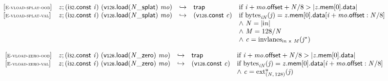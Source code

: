 $$
\begin{array}{@{}l@{}lcl@{}l@{}}
{[\textsc{\scriptsize E{-}vload{-}splat{-}oob}]} \quad & {\mathit{z}} ; (\mathsf{i{\scriptstyle32}}.\mathsf{const}~{\mathit{i}})~({\mathsf{v{\scriptstyle128}.load}}{({{{\mathit{N}}}{\mathsf{\_}}}{\mathsf{splat}})}~{\mathit{mo}}) &\hookrightarrow& \mathsf{trap} &\quad
  \mbox{if}~{\mathit{i}} + {\mathit{mo}}.\mathsf{offset} + {\mathit{N}} / 8 > {|{{\mathit{z}}.\mathsf{mem}}{{}[0]}.\mathsf{data}|} \\
{[\textsc{\scriptsize E{-}vload{-}splat{-}val}]} \quad & {\mathit{z}} ; (\mathsf{i{\scriptstyle32}}.\mathsf{const}~{\mathit{i}})~({\mathsf{v{\scriptstyle128}.load}}{({{{\mathit{N}}}{\mathsf{\_}}}{\mathsf{splat}})}~{\mathit{mo}}) &\hookrightarrow& (\mathsf{v{\scriptstyle128}}.\mathsf{const}~{\mathit{c}}) &\quad
  \mbox{if}~{{\mathrm{bytes}}}_{{{\mathit{i}}}{{\mathit{N}}}}({\mathit{j}}) = {{\mathit{z}}.\mathsf{mem}}{{}[0]}.\mathsf{data}{}[{\mathit{i}} + {\mathit{mo}}.\mathsf{offset} : {\mathit{N}} / 8] \\
 &&&&\quad {\land}~{\mathit{N}} = {|{\mathsf{i}}{{\mathit{n}}}|} \\
 &&&&\quad {\land}~{\mathit{M}} = 128 / {\mathit{N}} \\
 &&&&\quad {\land}~{\mathit{c}} = {{\mathrm{invlanes}}}_{{\mathsf{i}}{{\mathit{n}}}~\mathsf{x}~{\mathit{M}}}({{\mathit{j}}^\ast}) \\
\end{array}
$$

\vspace{1ex}

$$
\begin{array}{@{}l@{}lcl@{}l@{}}
{[\textsc{\scriptsize E{-}vload{-}zero{-}oob}]} \quad & {\mathit{z}} ; (\mathsf{i{\scriptstyle32}}.\mathsf{const}~{\mathit{i}})~({\mathsf{v{\scriptstyle128}.load}}{({{{\mathit{N}}}{\mathsf{\_}}}{\mathsf{zero}})}~{\mathit{mo}}) &\hookrightarrow& \mathsf{trap} &\quad
  \mbox{if}~{\mathit{i}} + {\mathit{mo}}.\mathsf{offset} + {\mathit{N}} / 8 > {|{{\mathit{z}}.\mathsf{mem}}{{}[0]}.\mathsf{data}|} \\
{[\textsc{\scriptsize E{-}vload{-}zero{-}val}]} \quad & {\mathit{z}} ; (\mathsf{i{\scriptstyle32}}.\mathsf{const}~{\mathit{i}})~({\mathsf{v{\scriptstyle128}.load}}{({{{\mathit{N}}}{\mathsf{\_}}}{\mathsf{zero}})}~{\mathit{mo}}) &\hookrightarrow& (\mathsf{v{\scriptstyle128}}.\mathsf{const}~{\mathit{c}}) &\quad
  \mbox{if}~{{\mathrm{bytes}}}_{{{\mathit{i}}}{{\mathit{N}}}}({\mathit{j}}) = {{\mathit{z}}.\mathsf{mem}}{{}[0]}.\mathsf{data}{}[{\mathit{i}} + {\mathit{mo}}.\mathsf{offset} : {\mathit{N}} / 8] \\
 &&&&\quad {\land}~{\mathit{c}} = {{{{\mathrm{ext}}}_{({\mathit{N}},\, 128)}^{\mathsf{u}}}}{({\mathit{j}})} \\
\end{array}
$$


